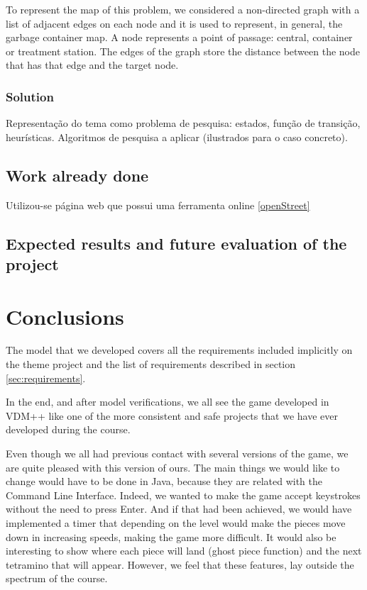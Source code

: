 \documentclass[a4paper]{article}
\begin{document}
To represent the map of this problem, we considered a non-directed graph with a list of adjacent edges on each node and it is used to represent, in general, the garbage container map. A node represents a point of passage: central, container or treatment station. The edges of the graph store the distance between the node that has that edge and the target node.

\subsubsection{Solution}


Representação do tema como problema de pesquisa: estados, função de transição, heurísticas.
Algoritmos de pesquisa a aplicar (ilustrados para o caso concreto).

\subsection{Work already done}

Utilizou-se página web que possui uma ferramenta online \ref{openStreet}

\subsection{Expected results and future evaluation of the project}

\section{Conclusions} 

The model that we developed covers all the requirements included implicitly on the theme project and the list of requirements described in section \ref{sec:requirements}.

In the end, and after model verifications, we all see the game developed in VDM++ like one of the more consistent and safe projects that we have ever developed during the course.

Even though we all had previous contact with several versions of the game, we are quite pleased with this version of ours. The main things we would like to change would have to be done in Java, because they are related with the Command Line Interface. Indeed, we wanted to make the game accept keystrokes without the need to press Enter. And if that had been achieved, we would have implemented a timer that depending on the level would make the pieces move down in increasing speeds, making the game more difficult. It would also be interesting to show where each piece will land (ghost piece function) and the next tetramino that will appear. However, we feel that these features, lay outside the spectrum of the course.
\end{document}
